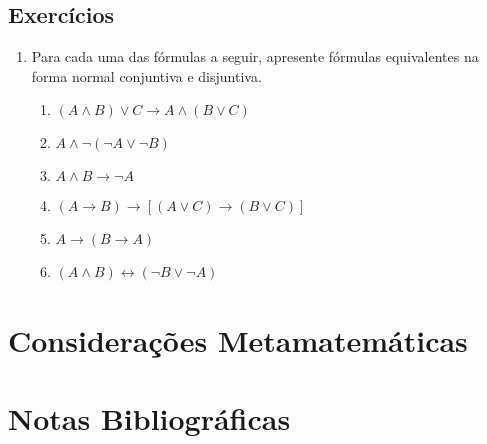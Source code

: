 \subsection{Exercícios}

\begin{enumerate}
        \item Para cada uma das fórmulas a seguir, apresente fórmulas
          equivalentes na forma normal conjuntiva e disjuntiva.
	\begin{enumerate}
		\item $(A\land B)\lor C\rightarrow A\land(B\lor C)$
		\item $A\land\neg (\neg A\lor \neg B)$
		\item $A\land B\rightarrow\neg A$
		\item $(A\rightarrow B)\rightarrow[(A\lor C)\rightarrow (B\lor C)]$
		\item $A\rightarrow(B\rightarrow A)$
		\item $(A\land B)\leftrightarrow(\neg B\lor \neg A)$
	\end{enumerate}
\end{enumerate}



\section{Considerações Metamatemáticas}

\section{Notas Bibliográficas}